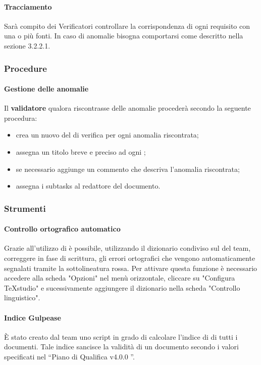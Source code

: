 	\paragraph{Tracciamento}
	\label{sec:3.2.1.4}
		Sarà compito dei Verificatori controllare la corrispondenza di ogni requisito con una o più fonti. In caso di anomalie bisogna comportarsi come descritto nella sezione 3.2.2.1. %
\subsubsection{Procedure}
\label{sec:3.2.2}
	\paragraph{Gestione delle anomalie}
	\label{sec:3.2.2.1}
			Il \textbf{validatore} qualora riscontrasse delle anomalie procederà secondo la seguente procedura:
			\begin{itemize}
				\item crea un nuovo  del  di verifica per ogni anomalia riscontrata;
				\item assegna un titolo breve e preciso ad ogni ;
				\item se necessario aggiunge un commento che descriva l'anomalia riscontrata;
				\item assegna i subtasks al redattore del documento.
			\end{itemize}
\subsubsection{Strumenti}
\label{sec:3.2.3}
\paragraph{Controllo ortografico automatico}
Grazie all'utilizzo di  è possibile, utilizzando il dizionario condiviso sul  del team, correggere in fase di scrittura, gli errori ortografici che vengono automaticamente segnalati tramite la sottolineatura rossa. Per attivare questa funzione è necessario accedere alla scheda "Opzioni" nel menù orizzontale, cliccare su "Configura TeXstudio" e sucessivamente aggiungere il dizionario nella scheda "Controllo linguistico".

\paragraph{Indice Gulpease}
È stato creato dal team uno script in grado di calcolare l’indice di  di tutti i documenti.
Tale indice sancisce la validità di un documento secondo i valori specificati nel “Piano di Qualifica v4.0.0 ”.

